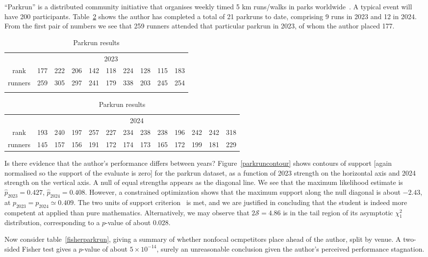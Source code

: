 \documentclass[article]{ajs}
\begin{document}
``Parkrun'' is a distributed community initiative that organises
weekly timed 5 km runs/walks in parks worldwide~\citep{hindley2020}.
A typical event will have 200 participants.  Table~\ref{parkruntable}
shows the author has completed a total of 21 parkruns to date,
comprising 9 runs in 2023 and 12 in 2024.  From the first pair of
numbers we see that 259 runners attended that particular parkrun in
2023, of whom the author placed 177.

\begin{table}[t]
  \centering
  \caption{Parkrun results}
\label{parkruntable}
\begin{tabular}{cccccccccc}\\
 & \multicolumn{9}{c}{2023}\\
rank   & 177& 222& 206& 142& 118& 224& 128& 115& 183\\
runners& 259& 305& 297& 241& 179& 338& 203& 245& 254\\ \\
\end{tabular}
\begin{tabular}{ccccccccccccc}
  & \multicolumn{12}{c}{2024}\\
rank   &  193& 240& 197& 257& 227& 234& 238& 238& 196& 242& 242& 318\\
runners&  145& 157& 156& 191& 172& 174& 173& 165& 172& 199& 181& 229\\
\end{tabular}
\end{table}

Is there evidence that the author's performance differs between
years?  Figure~\ref{parkruncontour} shows contours of
support [again normalised so the support of the evaluate is zero] for
the parkrun dataset, as a function of 2023 strength on the
horizontal axis and 2024 strength on the vertical axis.  A null of
equal strengths appears as the diagonal line.  We see that the maximum
likelihood estimate is $\hat{p}_\mathrm{2023}=0.427$,
$\hat{p}_\mathrm{2024}=0.408$.  However, a constrained optimization
shows that the maximum support along the null diagonal is about
$-2.43$, at ${p}_\mathrm{2023}={p}_\mathrm{2024}\simeq 0.409$.  The
two units of support criterion~\citep{edwards1972} is met, and we are
justified in concluding that the student is indeed more competent at
applied than pure mathematics.  Alternatively, we may observe that
$2\mathcal{S}=4.86$ is in the tail region of its asymptotic $\chi^2_1$
distribution, corresponding to a $p$-value of about $0.028$.

Now consider table~\ref{fisherparkrun}, giving a summary of whether
nonfocal ocmpetitors place ahead of the author, split by venue.  A
two-sided Fisher test gives a $p$-value of about $5\times 10^{-14}$,
surely an unreasonable conclusion given the author's perceived
performance stagnation.
\end{document}
